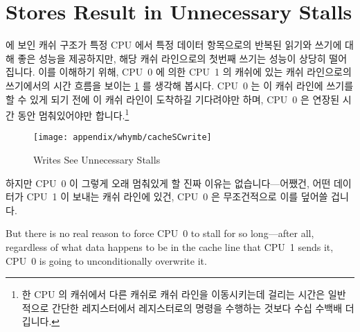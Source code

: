 \section{Stores Result in Unnecessary Stalls}
\label{sec:app:whymb:Stores Result in Unnecessary Stalls}

에 보인 캐쉬 구조가 특정 CPU 에서 특정 데이터 항목으로의 반복된 읽기와 쓰기에
대해 좋은 성능을 제공하지만, 해당 캐쉬 라인으로의 첫번째 쓰기는 성능이 상당히
떨어집니다.
이를 이해하기 위해, CPU~0 에 의한 CPU~1 의 캐쉬에 있는 캐쉬 라인으로의
쓰기에서의 시간 흐름을 보이는
\cref{fig:app:whymb:Writes See Unnecessary Stalls} 를 생각해 봅시다.
CPU~0 는 이 캐쉬 라인에 쓰기를 할 수 있게 되기 전에 이 캐쉬 라인이 도착하길
기다려야만 하며, CPU~0 은 연장된 시간 동안 멈춰있어야만 합니다.\footnote{
	한 CPU 의 캐쉬에서 다른 캐쉬로 캐쉬 라인을 이동시키는데 걸리는 시간은
	일반적으로 간단한 레지스터에서 레지스터로의 명령을 수행하는 것보다 수십
	수백배 더 깁니다.}

\iffalse

Although the cache structure shown in
\cref{fig:app:whymb:Modern Computer System Cache Structure}
provides good performance for repeated reads and writes from a given CPU
to a given item of data, its performance for the first write to
a given cache line is quite poor.
To see this, consider
\cref{fig:app:whymb:Writes See Unnecessary Stalls},
which shows a timeline of a write by CPU~0 to a cacheline held in
CPU~1's cache.
Since CPU~0 must wait for the cache line to arrive before it can
write to it, CPU~0 must stall for an extended period of time.\footnote{
	The time required to transfer a cache line from one CPU's cache
	to another's is typically a few orders of magnitude more than
	that required to execute a simple register-to-register instruction.}

\fi

\begin{figure}[htb]
\centering
\texttt{[image: appendix/whymb/cacheSCwrite]}
\caption{Writes See Unnecessary Stalls}
\label{fig:app:whymb:Writes See Unnecessary Stalls}
\end{figure}

하지만 CPU~0 이 그렇게 오래 멈춰있게 할 진짜 이유는 없습니다---어쨌건, 어떤
데이터가 CPU~1 이 보내는 캐쉬 라인에 있건, CPU~0 은 무조건적으로 이를 덮어쓸
겁니다.

\iffalse

But there is no real reason to force CPU~0 to stall for so long---after
all, regardless of what data happens to be in the cache line that CPU~1
sends it, CPU~0 is going to unconditionally overwrite it.

